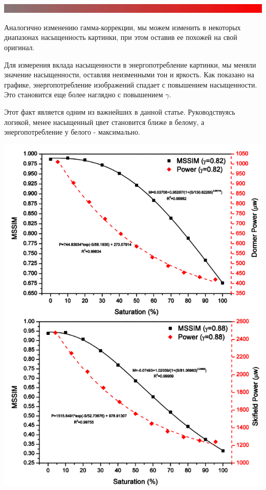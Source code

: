 \documentclass[a4paper, 12pt]{article}
\begin{document}
   \includegraphics[scale=0.6]{6}
    
    Аналогично изменению гамма-коррекции, мы можем изменить в некоторых диапазонах насыщенность картинки, при этом оставив ее похожей на свой оригинал.
    
    Для измерения вклада насыщенности в энергопотребление картинки, мы меняли значение насыщенности, оставляя неизменными тон и яркость. Как показано на графике, энергопотребление изображений спадает с повышением насыщенности. Это становится еще более наглядно с повышением $\gamma$.
    
    Этот факт является одним из важнейших в данной статье. Руководствуясь логикой, менее насыщенный цвет становится ближе в белому, а энергопотребление у белого - максимально.
    
	\includegraphics[scale=0.8]{7}
    
\end{document}
